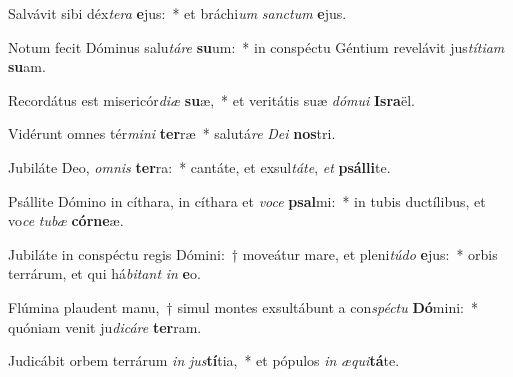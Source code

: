 \item Salvávit sibi déx\textit{te}\textit{ra} \textbf{e}jus:~* et bráchi\textit{um} \textit{sanc}\textit{tum} \textbf{e}jus.
\item Notum fecit Dóminus salu\textit{tá}\textit{re} \textbf{su}um:~* in conspéctu Géntium revelávit jus\textit{tí}\textit{ti}\textit{am} \textbf{su}am.
\item Recordátus est misericór\textit{di}\textit{æ} \textbf{su}æ,~* et veritátis suæ \textit{dó}\textit{mu}\textit{i} \textbf{Is}\textbf{ra}ël.
\item Vidérunt omnes tér\textit{mi}\textit{ni} \textbf{ter}ræ~* salutá\textit{re} \textit{De}\textit{i} \textbf{nos}tri.
\item Jubiláte Deo, \textit{om}\textit{nis} \textbf{ter}ra:~* cantáte, et exsul\textit{tá}\textit{te}, \textit{et} \textbf{psál}\textbf{li}te.
\item Psállite Dómino in cíthara, in cíthara et \textit{vo}\textit{ce} \textbf{psal}mi:~* in tubis ductílibus, et vo\textit{ce} \textit{tu}\textit{bæ} \textbf{cór}\textbf{ne}æ.
\item Jubiláte in conspéctu regis Dómini:~† moveátur mare, et pleni\textit{tú}\textit{do} \textbf{e}jus:~* orbis terrárum, et qui há\textit{bi}\textit{tant} \textit{in} \textbf{e}o.
\item Flúmina plaudent manu,~† simul montes exsultábunt a con\textit{spéc}\textit{tu} \textbf{Dó}mini:~* quóniam venit ju\textit{di}\textit{cá}\textit{re} \textbf{ter}ram.
\item Judicábit orbem terrárum \textit{in} \textit{jus}\textbf{tí}tia,~* et pópulos \textit{in} \textit{æ}\textit{qui}\textbf{tá}te.
